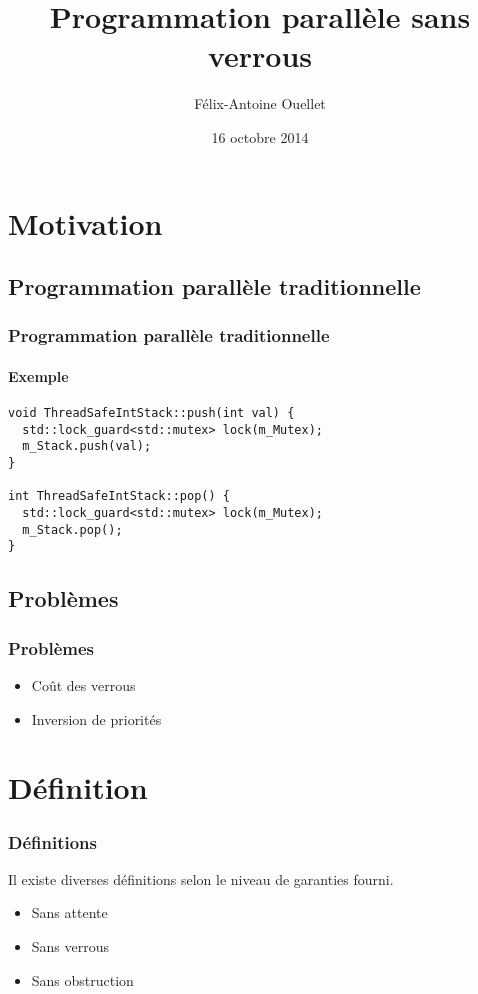 \documentclass{beamer}
\author[Félix-Antoine Ouellet]{Félix-Antoine Ouellet}
\title[Lock-free\hspace{2em}\insertframenumber/\inserttotalframenumber]{Programmation parallèle sans verrous}
\institute{Université de Sherbrooke}
\date{16 octobre 2014}
\begin{document}
\begin{frame}
\titlepage %
\end{frame}

\begin{frame}
\tableofcontents[hideallsubsections]
\end{frame}

\section{Motivation}
\subsection{Programmation parallèle traditionnelle}
\begin{frame}[fragile]
\frametitle{Programmation parallèle traditionnelle}
\framesubtitle{Exemple}
\begin{lstlisting}
void ThreadSafeIntStack::push(int val) {
  std::lock_guard<std::mutex> lock(m_Mutex);
  m_Stack.push(val);
}

int ThreadSafeIntStack::pop() {
  std::lock_guard<std::mutex> lock(m_Mutex);
  m_Stack.pop();
}
\end{lstlisting}
\end{frame}

\subsection{Problèmes}
\begin{frame}
\frametitle{Problèmes}
\begin{itemize}
\item Coût des verrous
\item Inversion de priorités
\end{itemize}
\end{frame}

\section{Définition}
\begin{frame}
\frametitle{Définitions}
Il existe diverses définitions selon le niveau de garanties fourni.
\begin{itemize}
\item Sans attente
\item Sans verrous
\item Sans obstruction
\end{itemize}
\end{frame}
\end{document}
